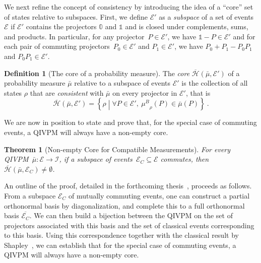 \documentclass[english,reprint, aps, prl,superscriptaddress, showpacs,
showkeys, longbibliography, amsmath, amssymb, floatfix]{revtex4-1}
\theoremstyle{plain}
\newtheorem{thm}{Theorem}
\theoremstyle{definition}
\newtheorem{definition}{Definition}
\newcommand{\Hilb}{\mathcal{H}}
\newcommand{\events}{\ensuremath{\mathcal{E}}}
\newcommand{\set}[2]{\ensuremath{\left\{ {#1}\mathrel{}\middle|\mathrel{}{#2}\right\} }}
\newcommand{\coreBorn}{\ensuremath{\overline{\Hilb}}}
\newcommand{\muB}{\ensuremath{\mu^{B}}}
\newcommand{\eventsC}{\ensuremath{\events_{C}}}
\begin{document}
We next refine the concept of consistency by introducing the idea of
a ``core'' set of states relative to subspaces. First, we define
$\events'$ as a \emph{subspace} of a set of events~$\events$ if
$\events'$ contains the projectors $\mathbb{0}$ and $\mathbb{1}$ and is closed under
complements, sums, and products.  In particular, for any
projector~$P\in\events'$, we have
$\mathbb{1}-P\in\events'$ and for each pair of commuting
projectors~$P_{0}\in\events'$ and $P_{1}\in\events'$, we have
$P_{0}+P_{1}-P_{0}P_{1}$ and $P_{0}P_{1}\in\events'$.

\begin{definition}[The core of a probability measure]\label{def:core} The
\emph{core}
$\coreBorn\left(\bar{\mu},\events'\right)$ of a probability measure 
$\bar{\mu}$ relative to a subspace of events $\events'$ is the
collection of all states $\rho$ that are \emph{consistent} with 
$\bar{\mu}$ on every projector in $\events'$, that is
\begin{equation}
\label{eq:hbar}
\coreBorn\left(\bar{\mu},\events'\right) = \set{\rho}{\forall P\in
\events',~\muB_{\rho}\left(P\right)\in\bar{\mu}\left(P\right)} \ .
\end{equation}
\end{definition}

We are now in position to state and prove that, for the special case
of commuting events, a QIVPM will always have a non-empty core.

\begin{thm}[Non-empty Core for Compatible Measurements] \label{thm:Shapley}
  For every QIVPM~$\bar{\mu}:\events\rightarrow\mathscr{I}$, if a subspace
  of events~$\eventsC\subseteq\events$ commutes, then
  $\coreBorn\left(\bar{\mu},\eventsC\right)\ne\emptyset$.
\end{thm}

An outline of the proof, detailed in the forthcoming
thesis~\cite{TaiThesis2018}, proceeds as
follows. From a subspace $\eventsC$ of mutually commuting events, one
can construct a partial orthonormal basis by diagonalization, and
complete this to a full orthonormal basis $\overline{\eventsC}$.  We
can then build a bijection between the QIVPM on the set of projectors
associated with this basis and the set of classical events
corresponding to this basis.  Using this correspondence together with
the classical result by
Shapley~\cite{Shapley1971,GilboaSchmeidler1994,NgMoYeh1997,Grabisch2016},
we can establish that for the special case of commuting events, a
QIVPM will always have a non-empty core.
\end{document}
